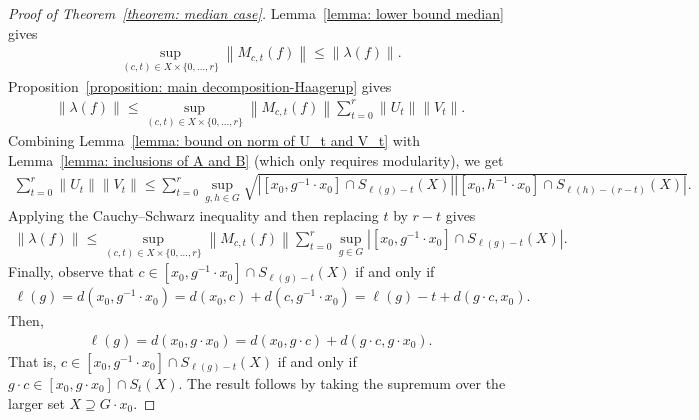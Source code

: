 \documentclass[12pt,reqno]{amsart}
\newcommand{\norm}[1]{\left\|#1\right\|}
\numberwithin{equation}{section}
\begin{document}
\begin{proof}[Proof of Theorem~\ref{theorem: median case}]
    Lemma~\ref{lemma: lower bound median} gives
    \begin{align*}
        \sup_{(c,t)\in X\times \{0,\ldots,r\}}\norm{M_{c,t}(f)}\le \norm{\lambda(f)}.
    \end{align*}
    Proposition~\ref{proposition: main decomposition-Haagerup} gives
    \begin{align*}
        \norm{\lambda(f)}\le \sup_{(c,t)\in X\times \{0,\ldots,r\}}\norm{M_{c,t}(f)}\sum_{t=0}^r\norm{U_t}\norm{V_t}.
    \end{align*}
    Combining Lemma~\ref{lemma: bound on norm of U_t and V_t} with Lemma~\ref{lemma: inclusions of A and B} (which only requires modularity), we get
    \begin{align*}
         \sum_{t=0}^r\norm{U_t}\norm{V_t}\le \sum_{t=0}^r \sup_{g,h\in G}\sqrt{|[x_0,g^{-1}\cdot x_0]\cap S_{\ell(g)-t}(X)||[x_0,h^{-1}\cdot x_0]\cap S_{\ell(h)-(r-t)}(X)|}.
    \end{align*}
    Applying the Cauchy--Schwarz inequality and then replacing $t$ by $r-t$ gives
    \begin{align*}
         \norm{\lambda(f)}\le \sup_{(c,t)\in X\times \{0,\ldots,r\}}\norm{M_{c,t}(f)}\sum_{t=0}^r \sup_{g\in G}|[x_0,g^{-1}\cdot x_0]\cap S_{\ell(g)-t}(X)|.
    \end{align*}
    Finally, observe that $c\in [x_0,g^{-1}\cdot x_0]\cap S_{\ell(g)-t}(X)$ if and only if
    \begin{align*}
        \ell(g)=d(x_0,g^{-1}\cdot x_0)=d(x_0,c)+d(c,g^{-1}\cdot x_0)=\ell(g)-t+d(g\cdot c,x_0).
    \end{align*}
    Then,
    \begin{align*}
        \ell(g)=d(x_0,g\cdot x_0)=d(x_0,g\cdot c)+d(g\cdot c,g\cdot x_0).
    \end{align*}
    That is, $c\in [x_0,g^{-1}\cdot x_0]\cap S_{\ell(g)-t}(X)$ if and only if $g\cdot c\in [x_0,g\cdot x_0]\cap S_t(X)$. The result follows by taking the supremum over the larger set $X\supseteq G\cdot x_0$.
\end{proof}
\end{document}

